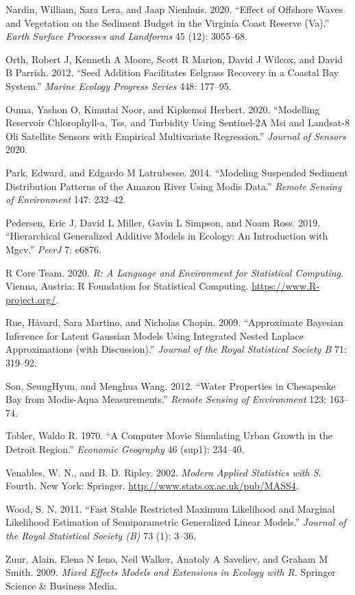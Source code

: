 \documentclass[11pt,]{article}
\begin{document}
\leavevmode\hypertarget{ref-nardin2020}{}%
Nardin, William, Sara Lera, and Jaap Nienhuis. 2020. ``Effect of
Offshore Waves and Vegetation on the Sediment Budget in the Virginia
Coast Reserve (Va).'' \emph{Earth Surface Processes and Landforms} 45
(12): 3055--68.

\leavevmode\hypertarget{ref-orth2012}{}%
Orth, Robert J, Kenneth A Moore, Scott R Marion, David J Wilcox, and
David B Parrish. 2012. ``Seed Addition Facilitates Eelgrass Recovery in
a Coastal Bay System.'' \emph{Marine Ecology Progress Series} 448:
177--95.

\leavevmode\hypertarget{ref-ouma2020}{}%
Ouma, Yashon O, Kimutai Noor, and Kipkemoi Herbert. 2020. ``Modelling
Reservoir Chlorophyll-a, Tss, and Turbidity Using Sentinel-2A Msi and
Landsat-8 Oli Satellite Sensors with Empirical Multivariate
Regression.'' \emph{Journal of Sensors} 2020.

\leavevmode\hypertarget{ref-park2014}{}%
Park, Edward, and Edgardo M Latrubesse. 2014. ``Modeling Suspended
Sediment Distribution Patterns of the Amazon River Using Modis Data.''
\emph{Remote Sensing of Environment} 147: 232--42.

\leavevmode\hypertarget{ref-pedersen2019}{}%
Pedersen, Eric J, David L Miller, Gavin L Simpson, and Noam Ross. 2019.
``Hierarchical Generalized Additive Models in Ecology: An Introduction
with Mgcv.'' \emph{PeerJ} 7: e6876.

\leavevmode\hypertarget{ref-rcite}{}%
R Core Team. 2020. \emph{R: A Language and Environment for Statistical
Computing}. Vienna, Austria: R Foundation for Statistical Computing.
\url{https://www.R-project.org/}.

\leavevmode\hypertarget{ref-rue2009}{}%
Rue, Håvard, Sara Martino, and Nicholas Chopin. 2009. ``Approximate
Bayesian Inference for Latent Gaussian Models Using Integrated Nested
Laplace Approximations (with Discussion).'' \emph{Journal of the Royal
Statistical Society B} 71: 319--92.

\leavevmode\hypertarget{ref-son2012}{}%
Son, SeungHyun, and Menghua Wang. 2012. ``Water Properties in Chesapeake
Bay from Modis-Aqua Measurements.'' \emph{Remote Sensing of Environment}
123: 163--74.

\leavevmode\hypertarget{ref-tobler1970}{}%
Tobler, Waldo R. 1970. ``A Computer Movie Simulating Urban Growth in the
Detroit Region.'' \emph{Economic Geography} 46 (sup1): 234--40.

\leavevmode\hypertarget{ref-venables2002}{}%
Venables, W. N., and B. D. Ripley. 2002. \emph{Modern Applied Statistics
with S}. Fourth. New York: Springer.
\url{http://www.stats.ox.ac.uk/pub/MASS4}.

\leavevmode\hypertarget{ref-wood2011}{}%
Wood, S. N. 2011. ``Fast Stable Restricted Maximum Likelihood and
Marginal Likelihood Estimation of Semiparametric Generalized Linear
Models.'' \emph{Journal of the Royal Statistical Society (B)} 73 (1):
3--36.

\leavevmode\hypertarget{ref-zuur2009}{}%
Zuur, Alain, Elena N Ieno, Neil Walker, Anatoly A Saveliev, and Graham M
Smith. 2009. \emph{Mixed Effects Models and Extensions in Ecology with
R}. Springer Science \& Business Media.

\newpage
\singlespacing 
\end{document}
